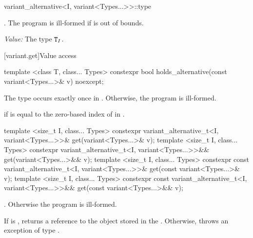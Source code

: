 %
\begin{itemdecl}
variant_alternative<I, variant<Types...>>::type
\end{itemdecl}

\begin{itemdescr}
\pnum
\requires {}.
The program is ill-formed if  is out of bounds.

\pnum
\textit{Value:} The type $\texttt{T}_I$.
\end{itemdescr}

[variant.get]{Value access}

\begin{itemdecl}
template <class T, class... Types>
  constexpr bool holds_alternative(const variant<Types...>& v) noexcept;
\end{itemdecl}

\begin{itemdescr}
\pnum
\requires
The type  occurs exactly once in .
Otherwise, the program is ill-formed.

\pnum
\returns
{} if  is equal to the zero-based index of  in .
\end{itemdescr}

%
\begin{itemdecl}
template <size_t I, class... Types>
  constexpr variant_alternative_t<I, variant<Types...>>& get(variant<Types...>& v);
template <size_t I, class... Types>
  constexpr variant_alternative_t<I, variant<Types...>>&& get(variant<Types...>&& v);
template <size_t I, class... Types>
  constexpr const variant_alternative_t<I, variant<Types...>>& get(const variant<Types...>& v);
template <size_t I, class... Types>
  constexpr const variant_alternative_t<I, variant<Types...>>&& get(const variant<Types...>&& v);
\end{itemdecl}

\begin{itemdescr}
\pnum
\requires
{}.
Otherwise the program is ill-formed.

\pnum
\effects
If  is , returns a reference to the object stored in
the . Otherwise, throws an exception of type .
\end{itemdescr}

